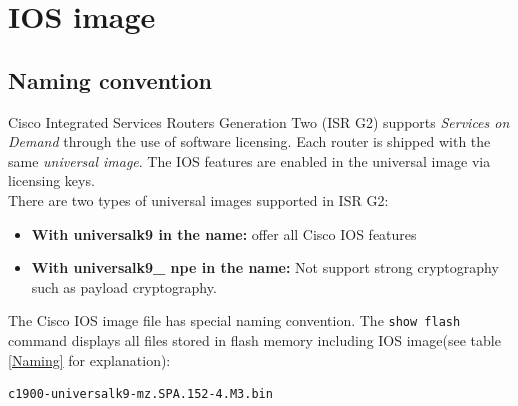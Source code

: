 \section{IOS image}

\subsection{Naming convention}

Cisco Integrated Services Routers Generation Two (ISR G2) supports \emph{Services on Demand} through the use of software licensing. Each router is shipped with the same \emph{universal image}. The IOS features are enabled in the universal image via licensing keys.\\

There are two types of universal images supported in ISR G2:

\begin{itemize}
\item \textbf{With universalk9 in the name:} offer all Cisco IOS features

\item \textbf{With universalk9\_ npe in the name:} Not support strong cryptography such as payload cryptography.
\end{itemize}


The Cisco IOS image file has special naming convention. The \verb|show flash| command displays all files stored in flash memory including IOS image(see table \ref{Naming} for explanation):

\begin{verbatim}
c1900-universalk9-mz.SPA.152-4.M3.bin
\end{verbatim}

